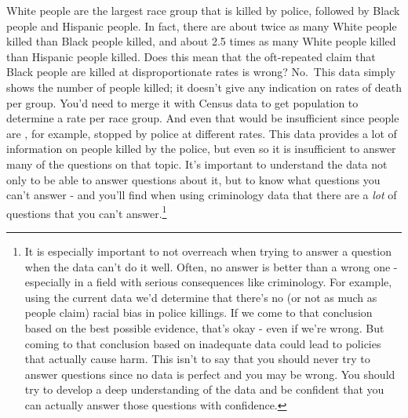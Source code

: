 \documentclass[
  12pt,
]{book}
\newenvironment{Shaded}{\begin{snugshade}}{\end{snugshade}}
\newcommand{\CommentTok}[1]{\textcolor[rgb]{0.37,0.37,0.37}{\textit{#1}}}
\newcommand{\DataTypeTok}[1]{\textcolor[rgb]{0.27,0.27,0.27}{#1}}
\newcommand{\DecValTok}[1]{\textcolor[rgb]{0.06,0.06,0.06}{#1}}
\newcommand{\KeywordTok}[1]{\textcolor[rgb]{0.27,0.27,0.27}{\textbf{#1}}}
\newcommand{\NormalTok}[1]{#1}
\newcommand{\OperatorTok}[1]{\textcolor[rgb]{0.43,0.43,0.43}{\textbf{#1}}}
\newcommand{\StringTok}[1]{\textcolor[rgb]{0.5,0.5,0.5}{#1}}
\begin{document}
\begin{Shaded}
\end{Shaded}

White people are the largest race group that is killed by police, followed by Black people and Hispanic people. In fact, there are about twice as many White people killed than Black people killed, and about 2.5 times as many White people killed than Hispanic people killed. Does this mean that the oft-repeated claim that Black people are killed at disproportionate rates is wrong? No.~This data simply shows the number of people killed; it doesn't give any indication on rates of death per group. You'd need to merge it with Census data to get population to determine a rate per race group. And even that would be insufficient since people are , for example, stopped by police at different rates. This data provides a lot of information on people killed by the police, but even so it is insufficient to answer many of the questions on that topic. It's important to understand the data not only to be able to answer questions about it, but to know what questions you can't answer - and you'll find when using criminology data that there are a \emph{lot} of questions that you can't answer.\footnote{It is especially important to not overreach when trying to answer a question when the data can't do it well. Often, no answer is better than a wrong one - especially in a field with serious consequences like criminology. For example, using the current data we'd determine that there's no (or not as much as people claim) racial bias in police killings. If we come to that conclusion based on the best possible evidence, that's okay - even if we're wrong. But coming to that conclusion based on inadequate data could lead to policies that actually cause harm. This isn't to say that you should never try to answer questions since no data is perfect and you may be wrong. You should try to develop a deep understanding of the data and be confident that you can actually answer those questions with confidence.}
\end{document}
